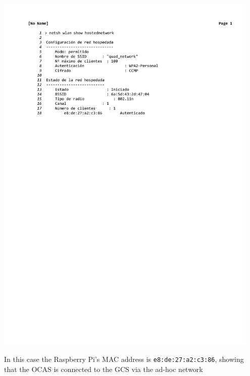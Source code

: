 \begin{enumerate}
		\hspace{0.05\textwidth}\includegraphics[width=0.95\textwidth,clip,trim={3.5cm 20cm 0 2.3cm}]{./files/shownetwork.pdf}

		In this case the Raspberry Pi's MAC address is \texttt{e8:de:27:a2:c3:86}, showing that the OCAS is connected to the GCS via the ad-hoc network

\end{enumerate}
